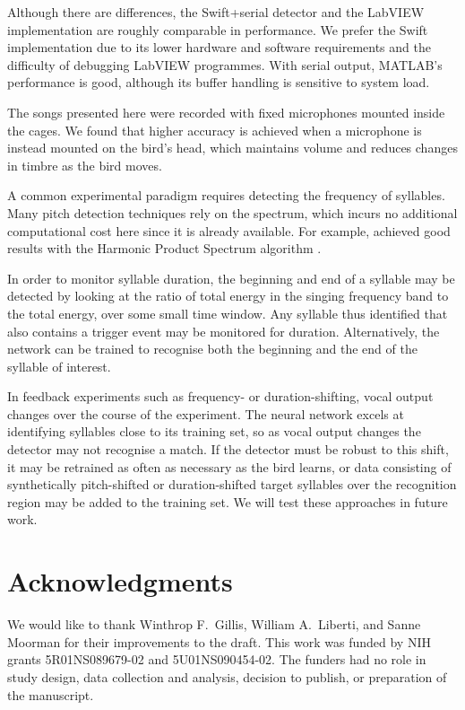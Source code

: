 \documentclass[10pt,letterpaper]{article}
\begin{document}
Although there are differences, the Swift+serial detector and the
LabVIEW implementation are roughly comparable in performance.  We
prefer the Swift implementation due to its lower hardware and software
requirements and the difficulty of debugging LabVIEW programmes.  With
serial output, MATLAB's performance is good, although its buffer
handling is sensitive to system load.

The songs presented here were recorded with fixed microphones mounted
inside the cages.  We found that higher accuracy is achieved when a
microphone is instead mounted on the bird's head, which maintains
volume and reduces changes in timbre as the bird moves.

A common experimental paradigm requires detecting the frequency of
syllables.  Many pitch detection techniques rely on the spectrum,
which incurs no additional computational cost here since it is already
available.  For example, \cite{Canopoli2014} achieved good results
with the Harmonic Product Spectrum algorithm
\cite{Noll1970pitchdetection}.

In order to monitor syllable duration, the beginning and end of a
syllable may be detected by looking at the ratio of total energy in
the singing frequency band to the total energy, over some small time
window.  Any syllable thus identified that also contains a trigger
event may be monitored for duration.  Alternatively, the network can
be trained to recognise both the beginning and the end of the syllable
of interest.

In feedback experiments such as frequency- or duration-shifting, vocal
output changes over the course of the experiment.  The neural network
excels at identifying syllables close to its training set, so as vocal
output changes the detector may not recognise a match.  If the
detector must be robust to this shift, it may be retrained as often as
necessary as the bird learns, or data consisting of synthetically
pitch-shifted or duration-shifted target syllables over the
recognition region may be added to the training set.  We will test
these approaches in future work.

\section{Acknowledgments}
We would like to thank Winthrop F.~Gillis, William A.~Liberti, and Sanne Moorman for
their improvements to the draft.  This work was funded by NIH grants
5R01NS089679-02 and 5U01NS090454-02.  The funders had no role in study design, data collection and analysis, decision to publish, or preparation of the manuscript.
\end{document}
